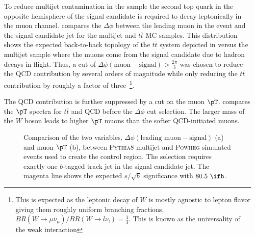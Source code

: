To reduce multijet contamination in the sample the second top quark in the
opposite hemisphere of the signal candidate is required to decay leptonically
in the muon channel.  compares the $\Delta\phi$
between the leading muon in the event and the signal candidate jet for the
multijet and $t\bar{t}$ MC samples. This distribution shows the expected
back-to-back topology of the $t\bar{t}$ system depicted in
 versus the multijet sample where the muons
come from the signal candidate due to hadron decays in flight. Thus, a cut of
$\Delta\phi(\text{muon} - \text{signal}) > \frac{2\pi}{3}$ was chosen to reduce
the QCD contribution by several orders of magnitude while only reducing the
$t\bar{t}$ contribution by roughly a factor of three~\footnote{This is expected
as the leptonic decay of $W$ is mostly agnostic to lepton flavor giving them
roughly uniform branching fractions, $BR(W \rightarrow \mu \nu_{\mu}) / BR(W
\rightarrow l \nu_l) = \frac{1}{3}$.  This is known as the universality of the
weak interaction}.

The QCD contribution is further suppressed by a cut on the muon $\pT$.
 compares the $\pT$ spectra for $t\bar{t}$ and
QCD before the $\Delta\phi$ cut selection. The larger mass of the $W$
boson leads to higher $\pT$ muons than the softer QCD-initiated muons.

\begin{figure}[!htbp]
\centering
{}\hfill
{}
\caption{Comparison of the two variables, $\Delta \phi(\text{leading muon}-\text{signal})$ (a) and muon $\pT$ (b), between \textsc{Pythia}8 multijet and \textsc{Powheg} \ttbar simulated events used to create the \ttbar control region. The selection requires exactly one $b$-tagged track jet in the signal candidate \largeR jet. The magenta line shows the expected $s/\sqrt{b}$ significance with $80.5~\ifb$.}
\label{sec:background:qcd_rejection_studies}
\end{figure}

